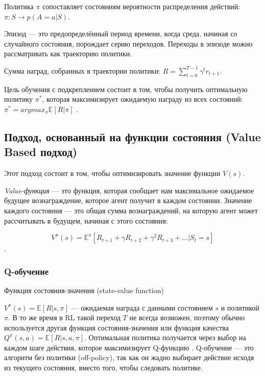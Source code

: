 Политика $\pi$ сопоставляет состояниям вероятности распределения действий: $\pi : S \to p(A = a|S)$. %

Эпизод --- это предопределённый период времени, когда среда, начиная со случайного состояния, порождает серию переходов. Переходы в эпизоде можно рассматривать как траекторию политики.

Сумма наград, собранных в траектории политики: $R = \sum_{t=0}^{T-1} \gamma^t r_{t+1}$.

Цель обучения с подкреплением состоит в том, чтобы получить оптимальную политику ${\pi^*}$, которая максимизирует ожидаемую награду из всех состояний: $\pi^* = argmax_x \mathbb{E} [R|\pi]$ \cite{Otterlo2012ReinforcementLA}.

\subsection{Подход, основанный на функции состояния (Value Based подход)}

Этот подход состоит в том, чтобы оптимизировать значение функции $V(s)$.

\textit{Value-функция} — это функция, которая сообщает нам максимальное ожидаемое будущее вознаграждение, которое агент получит в каждом состоянии. Значение каждого состояния — это общая сумма вознаграждений, на которую агент может рассчитывать в будущем, начиная с этого состояния:

\begin{equation} \label{eq:someEq}
V^\pi (s) = \mathbb{E}^\pi [R_{t+1} + \gamma R_{t+2} + \gamma^2 R_{t+3} + ... |S_t = s]
\end{equation}. %

\subsubsection{Q-обучение}

Функция состояния-значения (state-value function)

$V^\pi (s) = \mathbb{E}[R|s, \pi]$ --- ожидаемая награда с данными состоянием $s$ и политикой $\pi$. В то же время в RL такой переход $T$ не всегда возможен, поэтому обычно используется другая функция состояния-значения или функция качества $Q^\pi(s,a) = \mathbb{E}[R|s, a, \pi]$. Оптимальная политика получается через выбор на каждом шаге действия, которое максимизирует Q-функцию \cite{SuttonAndBarto-RL-Introduction-p107}. Q-обучение --- это алгоритм без политики (off-policy), так как он жадно выбирает действие исходя из текущего состояния, вместо того, чтобы следовать политике.

